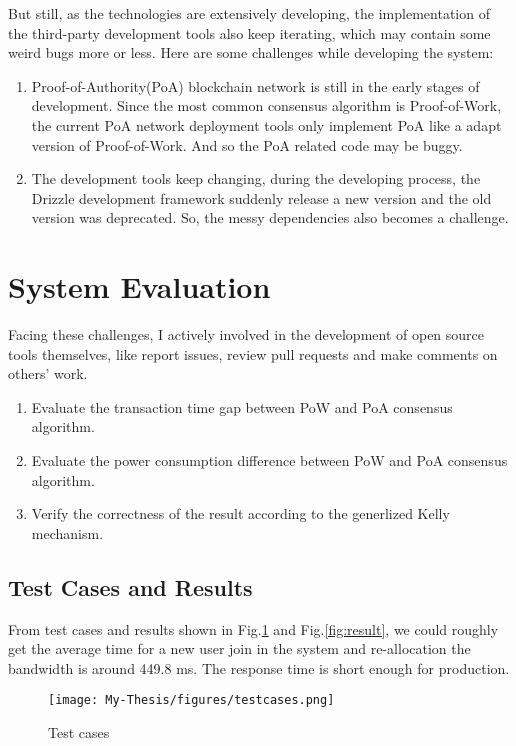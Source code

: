 But still, as the technologies are extensively developing, the implementation of the third-party development tools also keep iterating, which may contain some weird bugs more or less. Here are some challenges while developing the system: 
\begin{enumerate}

\item Proof-of-Authority(PoA) blockchain network is still in the early stages of development. Since the most common consensus algorithm is Proof-of-Work, the current PoA network deployment tools only implement PoA like a adapt version of Proof-of-Work. And so the PoA related code may be buggy.
\item The development tools keep changing, during the developing process, the Drizzle development framework suddenly release a new version and the old version was deprecated. So, the messy dependencies also becomes a challenge.
\end{enumerate}

\section{System Evaluation}

Facing these challenges, I actively involved in the development of open source tools themselves, like report issues, review pull requests and make comments on others' work.

\begin{enumerate}
\item Evaluate the transaction time gap between PoW and PoA consensus algorithm.
\item Evaluate the power consumption difference between PoW and PoA consensus algorithm.
\item Verify the correctness of the result according to the generlized Kelly mechanism.
\end{enumerate}

\subsection{Test Cases and Results}

From test cases and results shown in Fig.\ref{fig:test} and Fig.\ref{fig:result}, we could roughly get the average time for a new user join in the system and re-allocation the bandwidth is around 449.8 ms. The response time is short enough for production.

\begin{figure}[h]
    \centering
    \texttt{[image: My-Thesis/figures/testcases.png]}    
    \caption{Test cases}
    \label{fig:test}
\end{figure}

